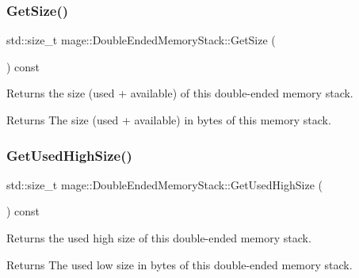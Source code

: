\subsubsection{\texorpdfstring{Get\+Size()}{GetSize()}}
{\footnotesize\ttfamily std\+::size\+\_\+t mage\+::\+Double\+Ended\+Memory\+Stack\+::\+Get\+Size (\begin{DoxyParamCaption}{ }\end{DoxyParamCaption}) const\hspace{0.3cm}{\ttfamily [noexcept]}}

Returns the size (used + available) of this double-\/ended memory stack.

\begin{DoxyReturn}{Returns}
The size (used + available) in bytes of this memory stack. 
\end{DoxyReturn}
\mbox{\label{classmage_1_1_double_ended_memory_stack_ac4eeccb7d21b8f89f3b838471c9a2416}} 
\subsubsection{\texorpdfstring{Get\+Used\+High\+Size()}{GetUsedHighSize()}}
{\footnotesize\ttfamily std\+::size\+\_\+t mage\+::\+Double\+Ended\+Memory\+Stack\+::\+Get\+Used\+High\+Size (\begin{DoxyParamCaption}{ }\end{DoxyParamCaption}) const\hspace{0.3cm}{\ttfamily [noexcept]}}

Returns the used high size of this double-\/ended memory stack.

\begin{DoxyReturn}{Returns}
The used low size in bytes of this double-\/ended memory stack. 
\end{DoxyReturn}
\mbox{\label{classmage_1_1_double_ended_memory_stack_ad79a70c39eeae4060151219731fec9c9}} 
